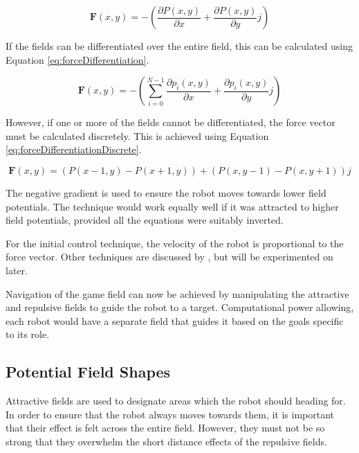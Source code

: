 \documentclass[10pt]{article}
\begin{document}
\begin{equation}
\boldsymbol{F}(x,y)=-\left(\frac{{\partial P\left(x,y\right)}}{\partial x}+\frac{{\partial P\left(x,y\right)}}{\partial y}j\right)\label{eq:forceSummation}
\end{equation}

If the fields can be differentiated over the entire field, this can be
calculated using Equation \ref{eq:forceDifferentiation}.

\begin{equation}
\boldsymbol{F}(x,y)=-\left(\sum_{i=0}^{N-1}\frac{\partial p_{i}\left(x,y\right)}{\partial x}+\frac{\partial p_{i}\left(x,y\right)}{\partial y}j\right)
\label{eq:forceDifferentiation}
\end{equation}

However, if one or more of the fields cannot be differentiated, the force vector
must be calculated discretely. This is achieved using Equation
\ref{eq:forceDifferentiationDiscrete}.

\begin{equation}
\boldsymbol{F}(x,y)=\left(P\left(x-1,y\right)-P\left(x+1,y\right)\right)+\left(P\left(x,y-1\right)-P\left(x,y+1\right)\right)j
\label{eq:forceDifferentiationDiscrete}
\end{equation}

The negative gradient is used to ensure the robot moves towards lower field
potentials. The technique would work equally well if it was attracted to higher
field potentials, provided all the equations were suitably inverted.

For the initial control technique, the velocity of the robot is proportional to
the force vector. Other techniques are discussed by
\cite{intelligentAlgorithmPathPlanning}, but will be experimented on later.

Navigation of the game field can now be achieved by manipulating the attractive
and repulsive fields to guide the robot to a target. Computational power
allowing, each robot would have a separate field that guides it based on the
goals specific to its role.

\subsection{Potential Field Shapes}

Attractive fields are used to designate areas which the robot should heading
for. In order to ensure that the robot always moves towards them, it is
important that their effect is felt across the entire field. However, they must
not be so strong that they overwhelm the short distance effects of the repulsive
fields.
\end{document}
